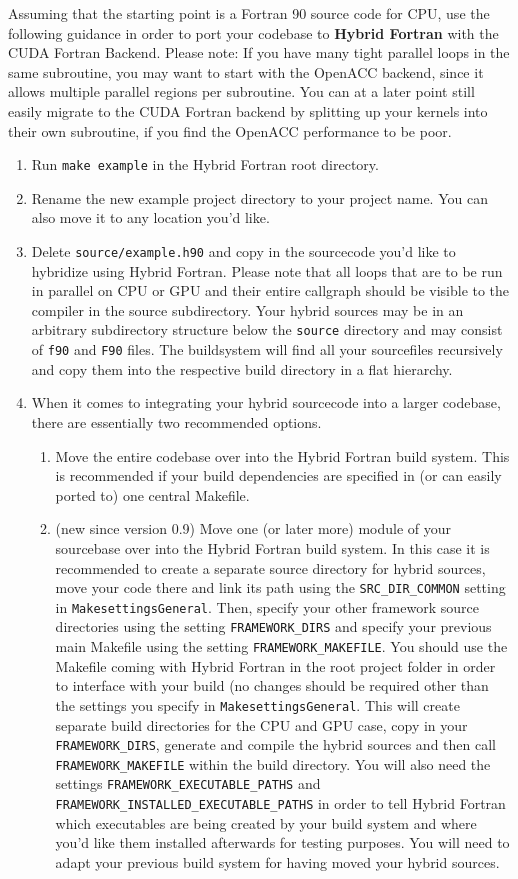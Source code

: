 Assuming that the starting point is a Fortran 90 source code for CPU, use the following guidance in order to port your codebase to \textbf{Hybrid Fortran} with the CUDA Fortran Backend. Please note: If you have many tight parallel loops in the same subroutine, you may want to start with the OpenACC backend, since it allows multiple parallel regions per subroutine. You can at a later point still easily migrate to the CUDA Fortran backend by splitting up your kernels into their own subroutine, if you find the OpenACC performance to be poor.

\begin{enumerate}
 \item Run \verb|make example| in the Hybrid Fortran root directory.
 \item Rename the new example project directory to your project name. You can also move it to any location you'd like.
 \item Delete \verb|source/example.h90| and copy in the sourcecode you'd like to hybridize using Hybrid Fortran. Please note that all loops that are to be run in parallel on CPU or GPU and their entire callgraph should be visible to the compiler in the source subdirectory. Your hybrid sources may be in an arbitrary subdirectory structure below the \verb|source| directory and may consist of \verb|f90| and \verb|F90| files. The buildsystem will find all your sourcefiles recursively and copy them into the respective build directory in a flat hierarchy.
 \item When it comes to integrating your hybrid sourcecode into a larger codebase, there are essentially two recommended options.
   \begin{enumerate}
     \item \label{enum:entireCodebase} Move the entire codebase over into the Hybrid Fortran build system. This is recommended if your build dependencies are specified in (or can easily ported to) one central Makefile.
     \item \label{enum:partOfFramework} (new since version 0.9) Move one (or later more) module of your sourcebase over into the Hybrid Fortran build system. In this case it is recommended to create a separate source directory for hybrid sources, move your code there and link its path using the \verb|SRC_DIR_COMMON| setting in \verb|MakesettingsGeneral|. Then, specify your other framework source directories using the setting \verb|FRAMEWORK_DIRS| and specify your previous main Makefile using the setting \verb|FRAMEWORK_MAKEFILE|. You should use the Makefile coming with Hybrid Fortran in the root project folder in order to interface with your build (no changes should be required other than the settings you specify in \verb|MakesettingsGeneral|. This will create separate build directories for the CPU and GPU case, copy in your \verb|FRAMEWORK_DIRS|, generate and compile the hybrid sources and then call \verb|FRAMEWORK_MAKEFILE| within the build directory. You will also need the settings \verb|FRAMEWORK_EXECUTABLE_PATHS| and \verb|FRAMEWORK_INSTALLED_EXECUTABLE_PATHS| in order to tell Hybrid Fortran which executables are being created by your build system and where you'd like them installed afterwards for testing purposes. You will need to adapt your previous build system for having moved your hybrid sources.

\end{enumerate}
\end{enumerate}

